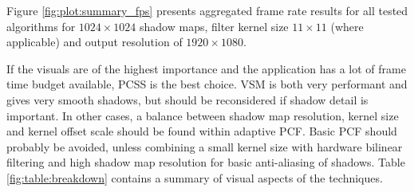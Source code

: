 Figure \ref{fig:plot:summary_fps} presents aggregated frame rate results for all tested algorithms for \(1024\times 1024\) shadow maps, filter kernel size \(11\times 11\) (where applicable) and output resolution of \(1920\times 1080\).

If the visuals are of the highest importance and the application has a lot of frame time budget available, PCSS is the best choice. VSM is both very performant and gives very smooth shadows, but should be reconsidered if shadow detail is important. In other cases, a balance between shadow map resolution, kernel size and kernel offset scale should be found within adaptive PCF. Basic PCF should probably be avoided, unless combining a small kernel size with hardware bilinear filtering and high shadow map resolution for basic anti-aliasing of shadows. Table \ref{fig:table:breakdown} contains a summary of visual aspects of the techniques.

